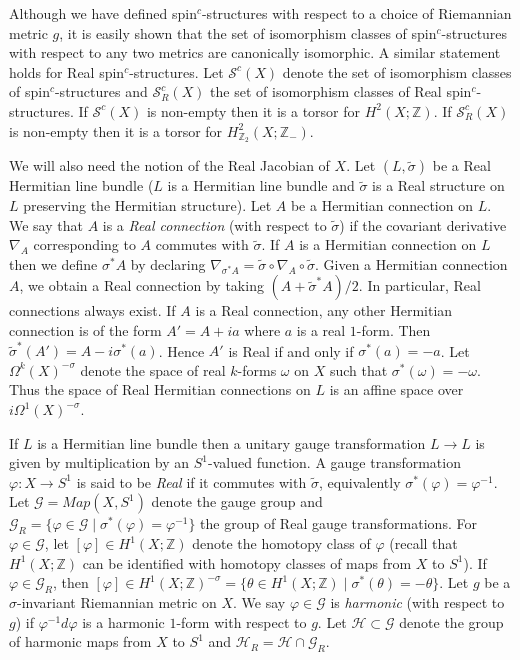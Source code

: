 \documentclass{amsart}
\theoremstyle{definition}
\theoremstyle{remark}
\numberwithin{equation}{section}
\begin{document}
Although we have defined spin$^c$-structures with respect to a choice of Riemannian metric $g$, it is easily shown that the set of isomorphism classes of spin$^c$-structures with respect to any two metrics are canonically isomorphic. A similar statement holds for Real spin$^c$-structures. Let $\mathcal{S}^c(X)$ denote the set of isomorphism classes of spin$^c$-structures and $\mathcal{S}^c_R(X)$ the set of isomorphism classes of Real spin$^c$-structures. If $\mathcal{S}^c(X)$ is non-empty then it is a torsor for $H^2(X ; \mathbb{Z})$. If $\mathcal{S}^c_R(X)$ is non-empty then it is a torsor for $H^2_{\mathbb{Z}_2}(X ; \mathbb{Z}_-)$.

We will also need the notion of the Real Jacobian of $X$. Let $(L , \widetilde{\sigma})$ be a Real Hermitian line bundle ($L$ is a Hermitian line bundle and $\widetilde{\sigma}$ is a Real structure on $L$ preserving the Hermitian structure). Let $A$ be a Hermitian connection on $L$. We say that $A$ is a {\em Real connection} (with respect to $\widetilde{\sigma}$) if the covariant derivative $\nabla_A$ corresponding to $A$ commutes with $\widetilde{\sigma}$. If $A$ is a Hermitian connection on $L$ then we define $\sigma^*A$ by declaring $\nabla_{\sigma^*A} = \widetilde{\sigma} \circ \nabla_A \circ \widetilde{\sigma}$. Given a Hermitian connection $A$, we obtain a Real connection by taking $(A + \widetilde{\sigma}^*A)/2$. In particular, Real connections always exist. If $A$ is a Real connection, any other Hermitian connection is of the form $A' = A + ia$ where $a$ is a real $1$-form. Then $\widetilde{\sigma}^*(A') = A - i\sigma^*(a)$. Hence $A'$ is Real if and only if $\sigma^*(a) = -a$. Let $\Omega^k(X)^{-\sigma}$ denote the space of real $k$-forms $\omega$ on $X$ such that $\sigma^*(\omega) = -\omega$. Thus the space of Real Hermitian connections on $L$ is an affine space over $i \Omega^1(X)^{-\sigma}$.

If $L$ is a Hermitian line bundle then a unitary gauge transformation $L \to L$ is given by multiplication by an $S^1$-valued function. A gauge transformation $\varphi : X \to S^1$ is said to be {\em Real} if it commutes with $\widetilde{\sigma}$, equivalently $\sigma^*(\varphi) = \varphi^{-1}$. Let $\mathcal{G} = Map(X , S^1)$ denote the gauge group and $\mathcal{G}_R = \{ \varphi \in \mathcal{G} \; | \; \sigma^*(\varphi) = \varphi^{-1} \}$ the group of Real gauge transformations. For $\varphi \in \mathcal{G}$, let $[\varphi] \in H^1(X ; \mathbb{Z})$ denote the homotopy class of $\varphi$ (recall that $H^1(X ; \mathbb{Z})$ can be identified with homotopy classes of maps from $X$ to $S^1$). If $\varphi \in \mathcal{G}_R$, then $[\varphi] \in H^1(X ; \mathbb{Z})^{-\sigma} = \{ \theta \in H^1(X ; \mathbb{Z}) \; | \; \sigma^*(\theta) = -\theta \}$. Let $g$ be a $\sigma$-invariant Riemannian metric on $X$. We say $\varphi \in \mathcal{G}$ is {\em harmonic} (with respect to $g$) if $\varphi^{-1} d\varphi$ is a harmonic $1$-form with respect to $g$. Let $\mathcal{H} \subset \mathcal{G}$ denote the group of harmonic maps from $X$ to $S^1$ and $\mathcal{H}_R = \mathcal{H} \cap \mathcal{G}_R$.
\end{document}

